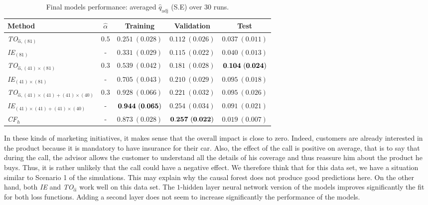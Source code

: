\documentclass{article}
\def\qadj{\hat{q}_{\mathrm{adj}}}
\begin{document}
\begin{table}[!ht]
    \centering
    \caption{Final models performance: averaged $\qadj$ (S.E) over $30$ runs.}
    \label{tab:final_models_results}
    \begin{tabular}{l|cccc}
        Method & $\hat{\alpha}$ & Training & Validation & Test \\
        \hline
        {\it TO$_{\hat{\alpha},(81)}$} & $0.5$ & $0.251~(0.028)$ & $0.112~(0.026)$ &  $0.037~(0.011)$\\
        {\it IE$_{(81)}$} & - & $0.331~(0.029)$ & $0.115~(0.022)$ & $0.040~(0.013)$\\
        \hline
        {\it TO$_{\hat{\alpha},(41)\times(81)}$} & $0.3$ & $0.539~(0.042)$ & $0.181~(0.028)$  & $\bf 0.104~(0.024) $ \\
        {\it IE$_{(41)\times(81)}$} & - & $0.705~(0.043)$ & $0.210~(0.029)$ &  $0.095~(0.018)$\\
        \hline
        {\it TO$_{\hat{\alpha},(41)\times(41) + (41)\times(40)}$} & $0.3$ & $0.928~(0.066)$ & $0.221~(0.032)$ & $0.095~(0.026)$ \\
        {\it IE$_{(41)\times(41) + (41)\times(40)}$} & - & $\bf 0.944~(0.065)$ & $0.254~(0.034)$ & $0.091~(0.021)$ \\
        \hline
        {\it CF$_{h}$} & - & $0.873~(0.028)$  & $\bf 0.257~(0.022)$ & $0.019~(0.007)$ \\
        \hline
    \end{tabular}
\end{table}


In these kinds of marketing initiatives, it makes sense that the overall impact is close to zero. Indeed, customers are already interested in the product because it is mandatory to have insurance for their car. Also, the effect of the call is positive on average, that is to say that during the call, the advisor allows the customer to understand all the details of his coverage and thus reassure him about the product he buys. Thus, it is rather unlikely that the call could have a negative effect. We therefore think that for this data set, we have a situation similar to Scenario 1 of the simulations. This may explain why the causal forest does not produce good predictions here. On the other hand, both {\it IE} and {\it TO$_{\hat\alpha}$} work well on this data set. The $1$-hidden layer neural network version of the models improves significantly the fit for both loss functions. Adding a second layer does not seem to increase significantly the performance of the models.
\end{document}
